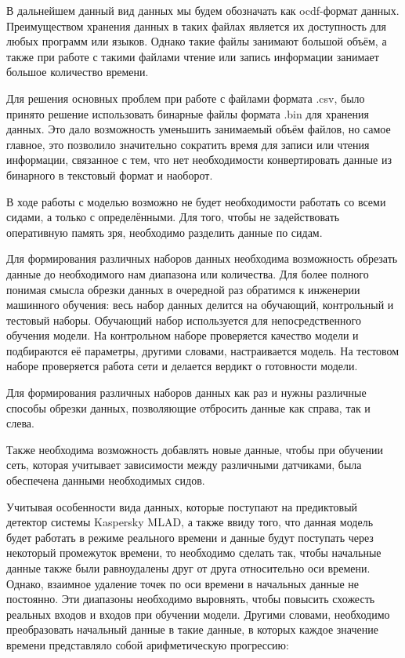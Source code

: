 {  \par \redline В дальнейшем данный вид данных мы будем обозначать как ocdf-формат данных. Преимуществом хранения данных в таких файлах является их доступность для любых программ или языков. Однако такие файлы занимают большой объём, а также при работе с такими файлами чтение или запись информации занимает большое количество времени.  

  \par \redline Для решения основных проблем при работе с файлами формата .csv, было принято решение использовать бинарные файлы формата .bin для хранения данных. Это дало возможность уменьшить занимаемый объём файлов, но самое главное, это позволило значительно сократить время для записи или чтения информации, связанное с тем, что нет необходимости конвертировать данные из бинарного в текстовый формат и наоборот.

  \par \redline В ходе работы с моделью возможно не будет необходимости работать со всеми сидами, а только с определёнными. Для того, чтобы не задействовать оперативную память зря, необходимо разделить данные по сидам.   

  \par \redline Для формирования различных наборов данных необходима возможность обрезать данные до необходимого нам диапазона или количества. Для более полного понимая смысла обрезки данных в очередной раз обратимся к инженерии машинного обучения: весь набор данных делится на обучающий, контрольный и тестовый наборы. Обучающий набор используется для непосредственного обучения модели. На контрольном наборе проверяется качество модели и подбираются её параметры, другими словами, настраивается модель. На тестовом наборе проверяется работа сети и делается вердикт о готовности модели. 

  \par \redline Для формирования различных наборов данных как раз и нужны различные способы обрезки данных, позволяющие отбросить данные как справа, так и слева. 
 
  \par \redline Также необходима возможность добавлять новые данные, чтобы при обучении сеть, которая учитывает зависимости между различными датчиками, была обеспечена данными необходимых сидов.  

  \par \redline Учитывая особенности вида данных, которые поступают на предиктовый детектор системы Kaspersky MLAD, а также ввиду того, что данная модель будет работать в режиме реального времени и данные будут поступать через некоторый промежуток времени, то необходимо сделать так, чтобы начальные данные также были равноудалены друг от друга относительно оси времени. Однако, взаимное удаление точек по оси времени в начальных данные не постоянно. Эти диапазоны необходимо выровнять, чтобы повысить схожесть реальных входов и входов при обучении модели. Другими словами, необходимо преобразовать начальный данные в такие данные, в которых каждое значение времени представляло собой арифметическую прогрессию:

}
